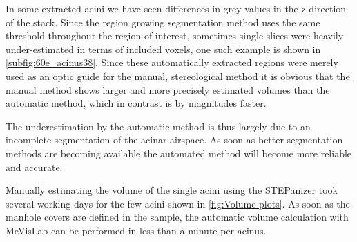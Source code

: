\documentclass[a4paper,DIV=calc,abstract,english]{scrartcl}
\begin{document}
In some extracted acini we have seen differences in grey values in the z-direction of the stack.
Since the region growing segmentation method uses the same threshold throughout the region of interest, sometimes single slices were heavily under-estimated in terms of included voxels, one such example is shown in \autoref{subfig:60e_acinus38}.
Since these automatically extracted regions were merely used as an optic guide for the manual, stereological method it is obvious that the manual method shows larger and more precisely estimated volumes than the automatic method, which in contrast is by magnitudes faster.

The underestimation by the automatic method is thus largely due to an incomplete segmentation of the acinar airspace.
As soon as better segmentation methods are becoming available the automated method will become more reliable and accurate.

Manually estimating the volume of the single acini using the STEPanizer took several working days for the few acini shown in \autoref{fig:Volume plots}.
As soon as the manhole covers are defined in the sample, the automatic volume calculation with MeVisLab can be performed in less than a minute per acinus.
\end{document}
